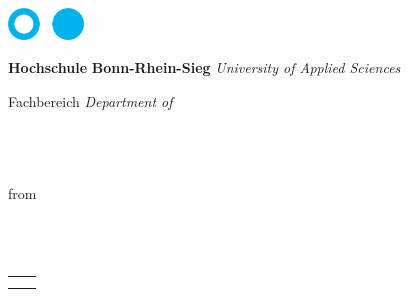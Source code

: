 \begin{titlepage}
\setlength{\wpYoffset}{22mm}



\hspace{16mm}
\parbox[t][][c]{20mm}{
	\includegraphics[width=20mm]{./img/icons/fhlogo.pdf}
}
\hspace{8mm}
\parbox[t][][c]{\textwidth - 49mm}{
	\vspace{1mm}
	\textbf{Hochschule} \newline
	\textbf{Bonn-Rhein-Sieg} \newline
	\small{\textit{University of Applied Sciences}} \newline
	\par Fachbereich \DepartmentGER \newline
	\small{\textit{Department of \Department}}
}
\vspace{40mm}

\begin{center}
\Huge \textbf{\DocumentType} \\
\vspace{5mm}
\large \CourseOfStudies \\
\vspace{30mm}
\huge \textbf{\DocumentTitle} \\
\vspace{26mm}
\large from \\
\vspace{1em}
\Large \textbf{\Author} \\
\vspace{2em}
\Large \textbf{\SecondAuthor} \\
\vspace{2em}
\Large \textbf{\ThirdAuthor} \\
\end{center}

\begin{table}[!b]
\centering
\begin{tabular}{ll}
               &                    \\
\DateOfSubmission	\\
\end{tabular}
\end{table}
\restoregeometry
\end{titlepage}